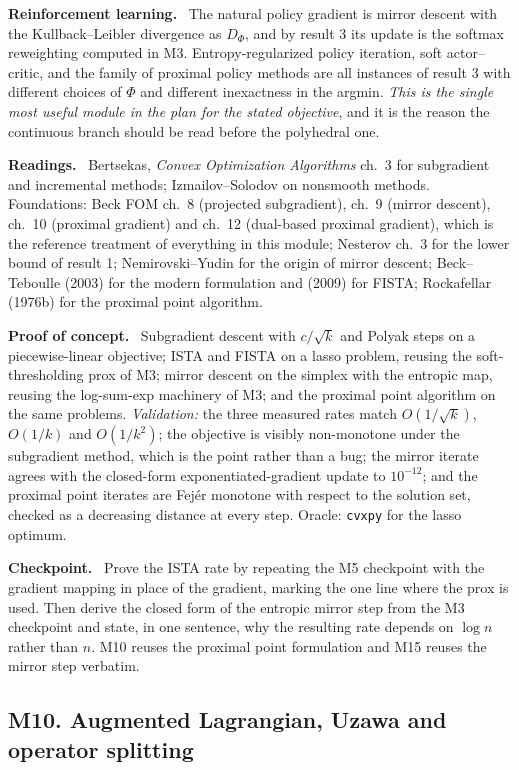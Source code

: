 \documentclass[11pt,a4paper]{article}
\newcommand{\mpart}[1]{\smallskip\noindent\textbf{#1}\ \ignorespaces}
\begin{document}
\mpart{Reinforcement learning.} The natural policy gradient is mirror descent with the
Kullback--Leibler divergence as $D_\Phi$, and by result 3 its update is the softmax reweighting
computed in M3. Entropy-regularized policy iteration, soft actor--critic, and the family of
proximal policy methods are all instances of result 3 with different choices of $\Phi$ and
different inexactness in the argmin. \emph{This is the single most useful module in the plan
for the stated objective}, and it is the reason the continuous branch should be read before
the polyhedral one.

\mpart{Readings.} Bertsekas, \emph{Convex Optimization Algorithms} ch.~3 for subgradient and
incremental methods; Izmailov--Solodov on nonsmooth methods. Foundations: Beck FOM ch.~8
(projected subgradient), ch.~9 (mirror descent), ch.~10 (proximal gradient) and ch.~12
(dual-based proximal gradient), which is the reference treatment of everything in this module;
Nesterov ch.~3 for the lower bound of result 1; Nemirovski--Yudin for the origin of mirror
descent; Beck--Teboulle (2003) for the modern formulation and (2009) for FISTA;
Rockafellar (1976b) for the proximal point algorithm.

\mpart{Proof of concept.} Subgradient descent with $c/\sqrt k$ and Polyak steps on a
piecewise-linear objective; ISTA and FISTA on a lasso problem, reusing the soft-thresholding
prox of M3; mirror descent on the simplex with the entropic map, reusing the log-sum-exp
machinery of M3; and the proximal point algorithm on the same problems.
\emph{Validation:} the three measured rates match $O(1/\sqrt k)$, $O(1/k)$ and $O(1/k^2)$; the
objective is visibly non-monotone under the subgradient method, which is the point rather than
a bug; the mirror iterate agrees with the closed-form exponentiated-gradient update to
$10^{-12}$; and the proximal point iterates are Fej\'er monotone with respect to the solution
set, checked as a decreasing distance at every step. Oracle: \texttt{cvxpy} for the lasso
optimum.

\mpart{Checkpoint.} Prove the ISTA rate by repeating the M5 checkpoint with the gradient
mapping in place of the gradient, marking the one line where the prox is used. Then derive the
closed form of the entropic mirror step from the M3 checkpoint and state, in one sentence, why
the resulting rate depends on $\log n$ rather than $n$. M10 reuses the proximal point
formulation and M15 reuses the mirror step verbatim.

\subsection{M10. Augmented Lagrangian, Uzawa and operator splitting}
\end{document}

